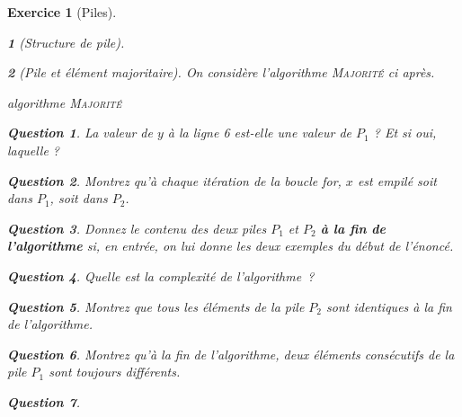 \documentclass{article}
\theoremstyle{exostyle}
\newtheorem{exo}{Exercice}
\theoremstyle{partiestyle}
\newtheorem{partie}{}[exo]
\theoremstyle{questionstyle}
\newtheorem{questionpartie}{Question}[partie]
\begin{document}
\begin{exo}[Piles]
\begin{partie}[Structure de pile]
    \end{partie}
    \begin{partie}[Pile et élément majoritaire]
    
        On considère l'algorithme \textsc{Majorité} ci après.
        \begin{algorithm}[h!]
            \DontPrintSemicolon
        \caption{algorithme \textsc{Majorité}}
        \end{algorithm}

        \begin{questionpartie}
                La valeur de $y$ à la ligne 6 est-elle une valeur de $P_1$ ? Et si oui, laquelle ?
        \end{questionpartie}
        \begin{questionpartie}
            Montrez qu'à chaque itération de la boucle for, $x$ est empilé soit dans $P_1$, soit dans $P_2$.
        \end{questionpartie}
        \begin{questionpartie}
            Donnez le contenu des deux piles $P_1$ et $P_2$ {\bf à la fin de l'algorithme} si, en entrée, on lui donne les deux exemples du début de l'énoncé.
        \end{questionpartie}
        \begin{questionpartie}
            Quelle est la complexité de l'algorithme~?
        \end{questionpartie}
        \begin{questionpartie}
            Montrez que tous les éléments de la pile $P_2$ sont identiques à la fin de l'algorithme. 
        \end{questionpartie}
        \begin{questionpartie}
            Montrez qu'à la fin de l'algorithme, deux éléments consécutifs de la pile $P_1$ sont toujours différents.        
        \end{questionpartie}
        \begin{questionpartie}
        

\end{questionpartie}
\end{partie}
\end{exo}
\end{document}

